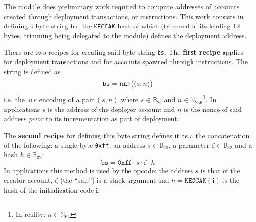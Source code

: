 The \rlpAddrMod{} module does preliminary work required to compute addresses of accounts created through deployment transactions,  or  instructions. This work consists in defining a byte string $\texttt{bs}$, the \texttt{KECCAK} hash of which (trimmed of its leading 12 bytes, trimming being delegated to the \trmMod{} module) defines the deployment address.

There are two recipes for creating said byte string \texttt{bs}. The \textbf{first recipe} applies for deployment transactions and for accounts spawned through  instructions. The string is defined as
\[
    \texttt{bs} = \textsc{rlp}\big((s,n)\big)
\]
i.e. the \textsc{rlp} encoding of a pair $(s, n)$ where $s \in \mathbb{B}_{20}$ and $n \in \mathbb{N}_{256}$\footnote{In reality: $n \in \mathbb{N}_{64}$}. In applications $s$ is the address of the deployer account and $n$ is the nonce of said address \emph{prior} to its incrementation as part of deployment.

The \textbf{second recipe} for defining this byte string defines it as a the concatenation of the following: a single byte \texttt{0xff}, an address $s\in\mathbb{B}_{20}$, a parameter $\zeta \in \mathbb{B}_{32}$ and a hash $h \in\mathbb{B}_{32}$:
\[
    \texttt{bs} =
    \texttt{0xff} \cdot
    s \cdot
    \zeta \cdot
    h
\]
In applications this method is used by the  opcode: the address $s$ is that of the creator account, $\zeta$ (the ``salt'') is a stack argument and $h = \texttt{KECCAK}(\textbf{i})$ is the hash of the initialization code $\textbf{i}$.
